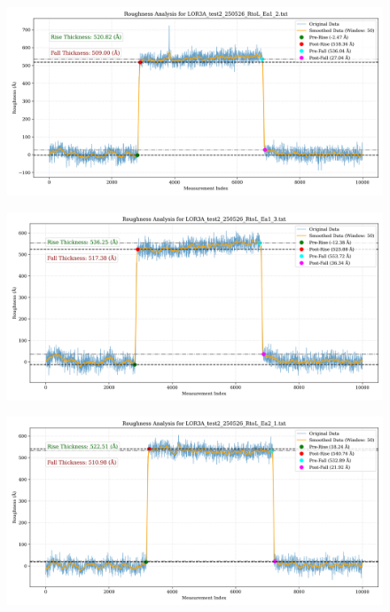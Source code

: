 \documentclass[platex,dvipdfmx,10pt,twoside,a4paper,jis2004]{jsarticle}
\begin{document}
\begin{figure}[H]
    \centering
    \includegraphics[width=\textwidth]{LOR3A_test2_250526_RtoL_Ea1_2.png}
    \label{fig:LOR3Atest2250526RtoLEa12}
\end{figure}
\begin{figure}[H]
    \centering
    \includegraphics[width=\textwidth]{LOR3A_test2_250526_RtoL_Ea1_3.png}
    \label{fig:LOR3Atest2250526RtoLEa13}
\end{figure}
\begin{figure}[H]
    \centering
    \includegraphics[width=\textwidth]{LOR3A_test2_250526_RtoL_Ea2_1.png}
    \label{fig:LOR3Atest2250526RtoLEa21}
\end{figure}
\end{document}
